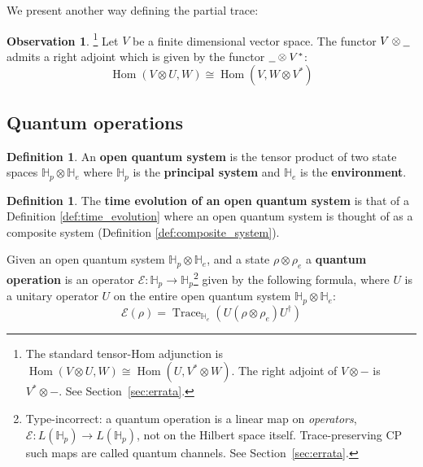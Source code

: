 \documentclass[12pt]{article}
\theoremstyle{plain}
\theoremstyle{definition}
\newtheorem{defn}[thm]{Definition} %
\newtheorem{observation}[thm]{Observation}
\newcommand{\bb}[1]{\mathbb{#1}}
\newcommand{\call}[1]{\mathcal{#1}}
\newcommand{\und}[1]{\underline{\hspace{#1 cm}}}
\newcommand{\lto}{\longrightarrow}
\begin{document}
We present another way defining the partial trace:
\begin{observation}\footnote{The standard tensor-Hom adjunction is $\operatorname{Hom}(V\otimes U,W)\cong\operatorname{Hom}(U,V^*\otimes W)$. The right adjoint of $V\otimes-$ is $V^*\otimes-$. See Section~\ref{sec:errata}.}
Let $V$ be a finite dimensional vector space. The functor $V \otimes {\und{0.2}}$ admits a right adjoint which is given by the functor $\und{0.2} \otimes V^\ast$:
\begin{equation}
\operatorname{Hom}(V \otimes U, W) \cong \operatorname{Hom}(V, W \otimes V^\ast)
\end{equation}
\end{observation}

\subsection{Quantum operations}
\begin{defn}
An \textbf{open quantum system} is the tensor product of two state spaces $\bb{H}_p \otimes \bb{H}_e$ where $\bb{H}_p$ is the \textbf{principal system} and $\bb{H}_e$ is the \textbf{environment}.
\end{defn}
\begin{defn}
The \textbf{time evolution of an open quantum system} is that of a Definition \ref{def:time_evolution} where an open quantum system is thought of as a composite system (Definition \ref{def:composite_system}).

Given an open quantum system $\bb{H}_p \otimes \bb{H}_e$, and a state $\rho \otimes \rho_e$ a \textbf{quantum operation} is an operator $\call{E}: \bb{H}_p \lto \bb{H}_p$\footnote{Type-incorrect: a quantum operation is a linear map on \emph{operators}, $\mathcal{E}:L(\mathbb{H}_p)\to L(\mathbb{H}_p)$, not on the Hilbert space itself. Trace-preserving CP such maps are called quantum channels. See Section~\ref{sec:errata}.} given by the following formula, where $U$ is a unitary operator $U$ on the entire open quantum system $\bb{H}_p \otimes \bb{H}_e$:
\begin{equation}\label{eq:quant_op_general_form}
\call{E}(\rho) = \operatorname{Trace}_{\bb{H}_e}(U (\rho \otimes \rho_e) U^\dagger)
\end{equation}
\end{defn}
\end{document}
